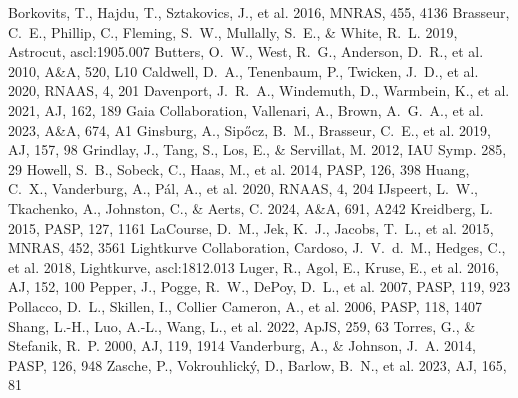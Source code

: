 \documentclass{aastex701}
\begin{document}
\begin{thebibliography}{}
 Borkovits, T., Hajdu, T., Sztakovics, J., et al. 2016, MNRAS, 455, 4136
 Brasseur, C.~E., Phillip, C., Fleming, S.~W., Mullally, S.~E., \& White, R.~L. 2019, Astrocut, ascl:1905.007
 Butters, O.~W., West, R.~G., Anderson, D.~R., et al. 2010, A\&A, 520, L10
 Caldwell, D.~A., Tenenbaum, P., Twicken, J.~D., et al. 2020, RNAAS, 4, 201
 Davenport, J.~R.~A., Windemuth, D., Warmbein, K., et al. 2021, AJ, 162, 189
 Gaia Collaboration, Vallenari, A., Brown, A.~G.~A., et al. 2023, A\&A, 674, A1
 Ginsburg, A., Sip{\H o}cz, B.~M., Brasseur, C.~E., et al. 2019, AJ, 157, 98
 Grindlay, J., Tang, S., Los, E., \& Servillat, M. 2012, IAU Symp. 285, 29
 Howell, S.~B., Sobeck, C., Haas, M., et al. 2014, PASP, 126, 398
 Huang, C.~X., Vanderburg, A., P\'al, A., et al. 2020, RNAAS, 4, 204
 IJspeert, L.~W., Tkachenko, A., Johnston, C., \& Aerts, C. 2024, A\&A, 691, A242
 Kreidberg, L. 2015, PASP, 127, 1161
 LaCourse, D.~M., Jek, K.~J., Jacobs, T.~L., et al. 2015, MNRAS, 452, 3561
 Lightkurve Collaboration, Cardoso, J.~V.~d.~M., Hedges, C., et al. 2018, Lightkurve, ascl:1812.013
 Luger, R., Agol, E., Kruse, E., et al. 2016, AJ, 152, 100
 Pepper, J., Pogge, R.~W., DePoy, D.~L., et al. 2007, PASP, 119, 923
 Pollacco, D.~L., Skillen, I., Collier Cameron, A., et al. 2006, PASP, 118, 1407
 Shang, L.-H., Luo, A.-L., Wang, L., et al. 2022, ApJS, 259, 63
 Torres, G., \& Stefanik, R.~P. 2000, AJ, 119, 1914
 Vanderburg, A., \& Johnson, J.~A. 2014, PASP, 126, 948
 Zasche, P., Vokrouhlick\'y, D., Barlow, B.~N., et al. 2023, AJ, 165, 81
\end{thebibliography}
\end{document}
